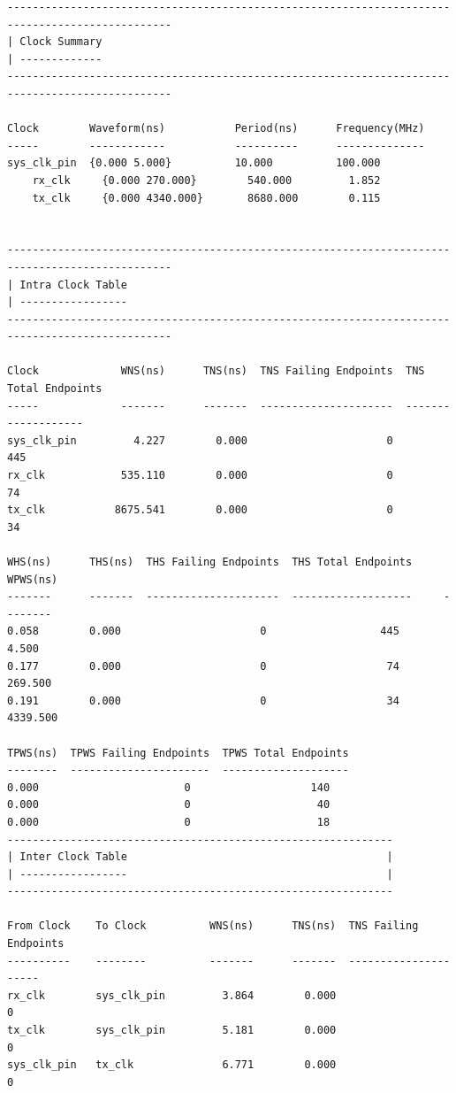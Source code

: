 \documentclass{report}
\begin{document}
\begin{verbatim}
------------------------------------------------------------------------------------------------
| Clock Summary
| -------------
------------------------------------------------------------------------------------------------

Clock        Waveform(ns)           Period(ns)      Frequency(MHz)
-----        ------------           ----------      --------------
sys_clk_pin  {0.000 5.000}          10.000          100.000         
    rx_clk     {0.000 270.000}        540.000         1.852           
    tx_clk     {0.000 4340.000}       8680.000        0.115           

    
------------------------------------------------------------------------------------------------
| Intra Clock Table
| -----------------
------------------------------------------------------------------------------------------------

Clock             WNS(ns)      TNS(ns)  TNS Failing Endpoints  TNS Total Endpoints
-----             -------      -------  ---------------------  -------------------
sys_clk_pin         4.227        0.000                      0                  445
rx_clk            535.110        0.000                      0                   74
tx_clk           8675.541        0.000                      0                   34

WHS(ns)      THS(ns)  THS Failing Endpoints  THS Total Endpoints     WPWS(ns)
-------      -------  ---------------------  -------------------     --------
0.058        0.000                      0                  445        4.500
0.177        0.000                      0                   74      269.500
0.191        0.000                      0                   34     4339.500

TPWS(ns)  TPWS Failing Endpoints  TPWS Total Endpoints  
--------  ----------------------  --------------------  
0.000                       0                   140  
0.000                       0                    40
0.000                       0                    18      
-------------------------------------------------------------
| Inter Clock Table                                         |
| -----------------                                         |
-------------------------------------------------------------

From Clock    To Clock          WNS(ns)      TNS(ns)  TNS Failing Endpoints
----------    --------          -------      -------  ---------------------
rx_clk        sys_clk_pin         3.864        0.000                      0
tx_clk        sys_clk_pin         5.181        0.000                      0
sys_clk_pin   tx_clk              6.771        0.000                      0


\end{verbatim}
\end{document}

